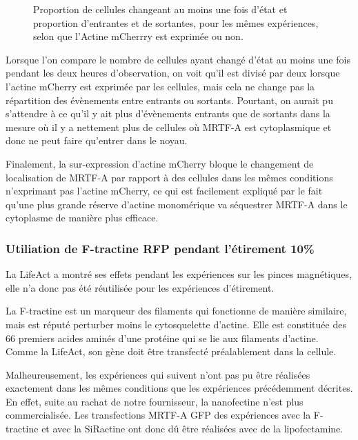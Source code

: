 \begin{figure}
\caption{\label{AMC}Répartition initiale pour des cellules issues des mêmes expériences exprimant ou non le plasmide Actine mCherry (683 cellules témoin et 538 cellules expriment l'Actine mCherry). **** : $p<10^{-4}$}\caption{\label{AMC_transloc}Proportion de cellules changeant au moins une fois d'état et proportion d'entrantes et de sortantes, pour les mêmes expériences, selon que l'Actine mCherrry est exprimée ou non.}
\end{figure}

Lorsque l'on compare le nombre de cellules ayant changé d'état au moins une fois pendant les deux heures d'observation, on voit qu'il est divisé par deux lorsque l'actine mCherry est exprimée par les cellules, mais cela ne change pas la répartition des évènements entre entrants ou sortants. 
Pourtant, on aurait pu s'attendre à ce qu'il y ait plus d'évènements entrants que de sortants dans la mesure où il y a nettement plus de cellules où MRTF-A est cytoplasmique et donc ne peut faire qu'entrer dans le noyau. 

Finalement, la sur-expression d'actine mCherry bloque le changement de localisation de MRTF-A par rapport à des cellules dans les mêmes conditions n'exprimant pas l’actine mCherry, ce qui est facilement expliqué par le fait qu'une plus grande réserve d'actine monomérique va séquestrer MRTF-A dans le cytoplasme de manière plus efficace.

\subsubsection{Utiliation de F-tractine RFP pendant l'étirement 10\%}


La LifeAct a montré ses effets pendant les expériences sur les pinces magnétiques, elle n'a donc pas été réutilisée pour les expériences d'étirement. 

La F-tractine est un marqueur des filaments qui fonctionne de manière similaire, mais est réputé perturber moins le cytosquelette d'actine. Elle est constituée des 66 premiers acides aminés d'une protéine qui se lie aux filaments d'actine. Comme la LifeAct, son gène doit être transfecté préalablement dans la cellule. 

Malheureusement, les expériences qui suivent n'ont pas pu être réalisées exactement dans les mêmes conditions que les expériences précédemment décrites. En effet, suite au rachat de notre fournisseur, la nanofectine n'est plus commercialisée. Les transfections MRTF-A GFP des expériences avec la F-tractine et avec la SiRactine ont donc dû être réalisées avec de la lipofectamine. 

